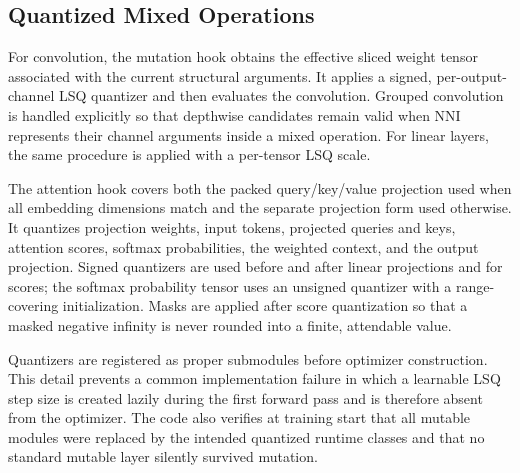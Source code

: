 \documentclass[lettersize,journal]{IEEEtran}
\begin{document}
\subsection{Quantized Mixed Operations}
For convolution, the mutation hook obtains the effective sliced weight tensor associated with the current structural arguments. It applies a signed, per-output-channel LSQ quantizer and then evaluates the convolution. Grouped convolution is handled explicitly so that depthwise candidates remain valid when NNI represents their channel arguments inside a mixed operation. For linear layers, the same procedure is applied with a per-tensor LSQ scale.

The attention hook covers both the packed query/key/value projection used when all embedding dimensions match and the separate projection form used otherwise. It quantizes projection weights, input tokens, projected queries and keys, attention scores, softmax probabilities, the weighted context, and the output projection. Signed quantizers are used before and after linear projections and for scores; the softmax probability tensor uses an unsigned quantizer with a range-covering initialization. Masks are applied after score quantization so that a masked negative infinity is never rounded into a finite, attendable value.

Quantizers are registered as proper submodules before optimizer construction. This detail prevents a common implementation failure in which a learnable LSQ step size is created lazily during the first forward pass and is therefore absent from the optimizer. The code also verifies at training start that all mutable modules were replaced by the intended quantized runtime classes and that no standard mutable layer silently survived mutation.
\end{document}
